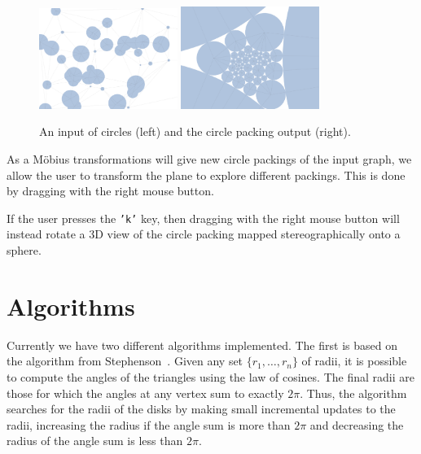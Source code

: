 \documentclass[a4paper,UKenglish]{lipics-v2016}
\begin{document}
  \begin{figure}[ht]
    \centering
      \includegraphics[width = 0.40\textwidth]{figures/input.png}
      \includegraphics[width = 0.40\textwidth]{figures/output.png}
    \caption{An input of circles (left) and the circle packing output (right).}
    \label{fig:input_output}
  \end{figure}
  
  As a M\"{o}bius transformations will give new circle packings of the input graph, we allow the user to transform the plane to explore different packings.
  This is done by dragging with the right mouse button.
  
  If the user presses the \texttt{'k'} key, then dragging with the right mouse button will instead rotate a 3D view of the circle packing mapped stereographically onto a sphere.
  
\section{Algorithms}
\label{sec:algorithms}

  Currently we have two different algorithms implemented.
  The first is based on the algorithm from Stephenson~\cite{stephenson05introduction}.
  Given any set $\{r_1,\ldots, r_n\}$ of radii, it is possible to compute the angles of the triangles using the law of cosines.
  The final radii are those for which the angles at any vertex sum to exactly $2\pi$.
  Thus, the algorithm searches for the radii of the disks by making small incremental updates to the radii, increasing the radius if the angle sum is more than $2\pi$ and decreasing the radius of the angle sum is less than $2\pi$.
  
\end{document}
